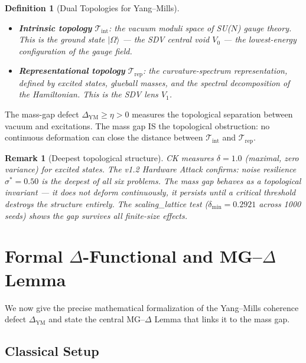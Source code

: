 \documentclass[11pt]{article}
\newtheorem{definition}[theorem]{Definition}
\newtheorem{remark}[theorem]{Remark}
\begin{document}
\begin{definition}[Dual Topologies for Yang--Mills]
\label{def:ym-topo}
\mbox{}
\begin{itemize}
\item \textbf{Intrinsic topology} $\mathcal{T}_{\mathrm{int}}$:
the vacuum moduli space of SU($N$) gauge theory.  This is the ground
state $|\Omega\rangle$ --- the SDV central void $V_0$ --- the
lowest-energy configuration of the gauge field.
\item \textbf{Representational topology} $\mathcal{T}_{\mathrm{rep}}$:
the curvature-spectrum representation, defined by excited states,
glueball masses, and the spectral decomposition of the Hamiltonian.
This is the SDV lens $V_1$.
\end{itemize}
\end{definition}

\noindent
The mass-gap defect $\Delta_{\mathrm{YM}} \geq \eta > 0$ measures
the topological separation between vacuum and excitations.  The mass
gap IS the topological obstruction: no continuous deformation can close
the distance between $\mathcal{T}_{\mathrm{int}}$ and
$\mathcal{T}_{\mathrm{rep}}$.

\begin{remark}[Deepest topological structure]
CK measures $\delta = 1.0$ (maximal, zero variance) for excited
states.  The v1.2 Hardware Attack confirms: noise resilience
$\sigma^* = 0.50$ is the deepest of all six problems.  The mass gap
behaves as a topological invariant --- it does not deform continuously,
it persists until a critical threshold destroys the structure entirely.
The scaling\_lattice test ($\delta_{\min} = 0.2921$ across 1000 seeds)
shows the gap survives all finite-size effects.
\end{remark}

\section{Formal $\Delta$-Functional and MG--$\Delta$ Lemma}
\label{sec:delta-functional}

We now give the precise mathematical formalization of the Yang--Mills
coherence defect $\Delta_{\mathrm{YM}}$ and state the central
MG--$\Delta$ Lemma that links it to the mass gap.

\subsection{Classical Setup}
\end{document}
